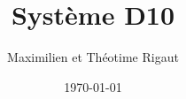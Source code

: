 \documentclass[12pt]{book}
\title{Système D10}
\author{Maximilien et Théotime Rigaut}
\date{\today}
\begin{document}
\maketitle


\frontmatter
 

\begin{center}
    \\[2.5ex]
    {\tiny\CcNote{\CcLongnameByNcSa}}
    \vspace*{-2.5ex}
\end{center}
\tableofcontents

\mainmatter





\end{document}
